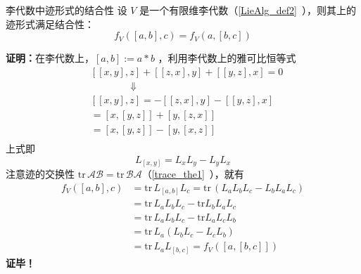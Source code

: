 \begin{theorem}{李代数中迹形式的结合性}\label{STAlg_the1}
设 $V$ 是一个有限维李代数（\autoref{LieAlg_def2}~），则其上的迹形式满足结合性：
\begin{equation}
f_V([a,b],c)=f_V(a,[b,c])
\end{equation}
\end{theorem}
\textbf{证明：}在李代数上，$[a,b]:=a*b$ ，利用李代数上的雅可比恒等式
\begin{equation}
\begin{aligned}
&[[x,y],z]+[[z,x],y]+[[y,z],x]=0\\
&\qquad\qquad\Downarrow\\
&[[x,y],z]=-[[z,x],y]-[[y,z],x]\\
&=[x,[y,z]]+[y,[z,x]]\\
&=[x,[y,z]]-[y,[x,z]]\\
\end{aligned}
\end{equation}
上式即
\begin{equation}
L_{[x,y]}=L_xL_y-L_yL_x
\end{equation}
注意迹的交换性 $\mathrm{tr}\, \mathcal A\mathcal B=\mathrm{tr}\, \mathcal B\mathcal A$（\autoref{trace_the1}~），就有
\begin{equation}
\begin{aligned}
f_V([a,b],c)&=\mathrm{tr}\,L_{[a,b]}L_c=\mathrm{tr}\,(L_aL_bL_c-L_bL_aL_c)\\
&=\mathrm{tr}\,L_aL_bL_c-\mathrm{tr}L_bL_aL_c\\
&=\mathrm{tr}\,L_aL_bL_c-\mathrm{tr}L_aL_cL_b\\
&=\mathrm{tr}\,L_a(L_bL_c-L_cL_b)\\
&=\mathrm{tr}\,L_aL_{[b,c]}=f_V([a,[b,c]])
\end{aligned}
\end{equation}
\textbf{证毕！}

